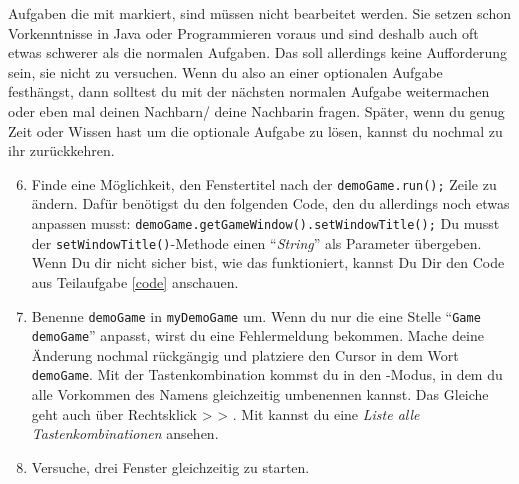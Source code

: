 \begin{Infobox}
    Aufgaben die mit \optional markiert, sind müssen nicht bearbeitet werden.
    Sie setzen schon Vorkenntnisse in Java oder Programmieren voraus und sind deshalb auch oft etwas schwerer als die normalen Aufgaben. Das soll allerdings keine Aufforderung sein, sie nicht zu versuchen.\newline
    Wenn du also an einer optionalen Aufgabe festhängst, dann solltest du mit der nächsten normalen Aufgabe weitermachen oder eben mal deinen Nachbarn/ deine Nachbarin fragen.\newline
    Später, wenn du genug Zeit oder Wissen hast um die optionale Aufgabe zu lösen, kannst du nochmal zu ihr zurückkehren.
\end{Infobox}


\begin{enumerate} \setcounter{enumi}{5}

	\item \optional Finde eine Möglichkeit, den Fenstertitel nach der \lstinline{demoGame.run();} Zeile zu ändern.
	Dafür benötigst du den folgenden Code, den du allerdings noch etwas anpassen musst:\newline
	\hspace*{\fill}\lstinline{demoGame.getGameWindow().setWindowTitle();}\hspace*{\fill}\newline
	\hint Du musst der \lstinline{setWindowTitle()}-Methode einen \enquote{\textit{String}} als Parameter übergeben. Wenn Du dir nicht sicher bist, wie das funktioniert, kannst Du Dir den Code aus Teilaufgabe \ref{code} anschauen.

	\item \optional Benenne \lstinline{demoGame} in \lstinline{myDemoGame} um.
	Wenn du nur die eine Stelle \enquote{\lstinline{Game demoGame}} anpasst, wirst du eine Fehlermeldung bekommen.
	Mache deine Änderung nochmal rückgängig und platziere den Cursor in dem Wort \lstinline{demoGame}.\newline
	Mit der Tastenkombination  kommst du in den -Modus, in dem du alle Vorkommen des Namens gleichzeitig umbenennen kannst.
	Das Gleiche geht auch über Rechtsklick >  > .\newline
	Mit  kannst du eine \textit{Liste alle Tastenkombinationen} ansehen.

	\item \optional Versuche, drei Fenster gleichzeitig zu starten.
\end{enumerate}
